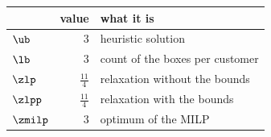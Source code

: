 \begin{center}\small
\begin{tabular}{lrl}
\toprule
 & value & what it is \\
\midrule
$\ub$ & $3$ & heuristic solution \\
$\lb$ & $3$ & count of the boxes per customer \\
$\zlp$ & $\frac{11}{4}$ & relaxation without the bounds \\
$\zlpp$ & $\frac{11}{4}$ & relaxation with the bounds \\
$\zmilp$ & $3$ & optimum of the MILP \\
\bottomrule
\end{tabular}
\end{center}

